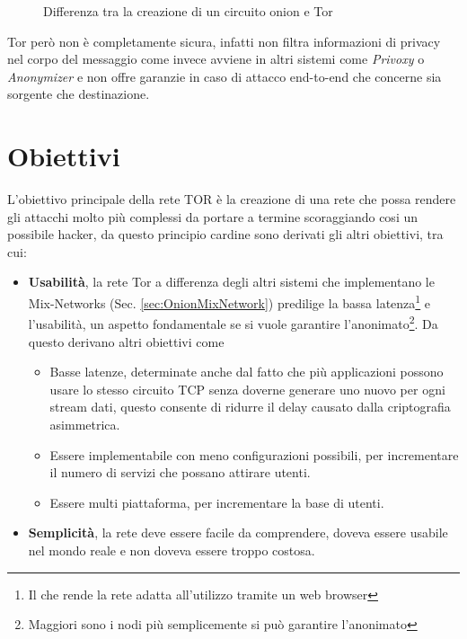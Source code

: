 \begin{figure}[htpb!]
    \centering
    
    \caption{Differenza tra la creazione di un circuito onion e Tor}
    \label{fig:telescopic}
\end{figure}

Tor però non è completamente sicura, infatti non filtra informazioni di privacy nel corpo del messaggio come invece avviene in altri sistemi come \emph{Privoxy} o \emph{Anonymizer} e non offre garanzie in caso di attacco end-to-end che concerne sia sorgente che destinazione.
\cite{onionv2}

\section{Obiettivi}
L'obiettivo principale della rete TOR è la creazione di una rete che possa rendere gli attacchi molto più complessi da portare a termine scoraggiando cosi un possibile hacker, da questo principio cardine sono derivati gli altri obiettivi, tra cui:
\begin{itemize}
    \item \textbf{Usabilità}, la rete Tor a differenza degli altri sistemi che implementano le Mix-Networks (Sec. \ref{sec:OnionMixNetwork}) predilige la bassa latenza\footnote{Il che rende la rete adatta all'utilizzo tramite un web browser} e l'usabilità, un aspetto fondamentale se si vuole garantire l'anonimato\footnote{Maggiori sono i nodi più semplicemente si può garantire l'anonimato}.
    Da questo derivano altri obiettivi come
    \begin{itemize}
        \item Basse latenze, determinate anche dal fatto che più applicazioni possono usare lo stesso circuito TCP senza doverne generare uno nuovo per ogni stream dati, questo consente di ridurre il delay causato dalla criptografia asimmetrica.
        \item Essere implementabile con meno configurazioni possibili, per incrementare il numero di servizi che possano attirare utenti.
        \item Essere multi piattaforma, per incrementare la base di utenti.
    \end{itemize}
    \item \textbf{Semplicità}, la rete deve essere facile da comprendere, doveva essere usabile nel mondo reale e non doveva essere troppo costosa.
\end{itemize}
\cite{ChaumMixes}


